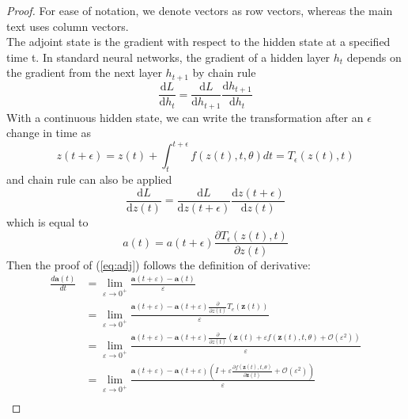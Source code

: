 \documentclass{article}
\newcommand\pef[1]{(\ref{#1})}
\begin{document}
	\begin{proof}
		For ease of notation, we denote vectors as row vectors, whereas the main text uses column vectors.
		\\
		
		The adjoint state is the gradient with respect to the hidden state at a specified time t. In standard neural networks,
		the gradient of a hidden layer $h_t$ depends on the gradient from the next layer $h_{t+1}$ by chain rule
		\begin{equation*}
		\frac{\text{d}L}{\text{d}h_t} = \frac{\text{d}L}{\text{d}h_{t+1}}\frac{\text{d}h_{t+1}}{\text{d}h_t}		
		\end{equation*}
		With a continuous hidden state, we can write the transformation after an $\epsilon$ change in time as
		\begin{equation*}
		z(t+\epsilon) = z(t) + \int_t^{t+\epsilon} f(z(t),t,\theta)dt = T_\epsilon(z(t),t)
		\end{equation*}
		and chain rule can also be applied
		\begin{equation*}
		\frac{\text{d}L}{\text{d}z(t)} = \frac{\text{d}L}{\text{d}{z(t+\epsilon)}}\frac{\text{d}z(t+\epsilon)}{\text{d}z(t)}
		\end{equation*}
		which is equal to
		\begin{equation*}
		a(t) = a(t+\epsilon)\frac{\partial T_\epsilon(z(t),t)}{\partial z(t)}
		\end{equation*}
		Then the proof of \pef{eq:adj} follows the definition of derivative: 
		\begin{equation*}	
		\begin{aligned}  \frac { d \mathbf { a } ( t ) } { d t }&= \lim _ { \varepsilon \rightarrow 0 ^ { + } } \frac { \mathbf { a } ( t + \varepsilon ) - \mathbf { a } ( t ) } { \varepsilon }\\
		&= \lim _ { \varepsilon \rightarrow 0 ^ { + } } \frac { \mathbf { a } ( t + \varepsilon ) - \mathbf { a } ( t + \varepsilon ) \frac { \partial } { \partial z ( t ) } T _ { e } ( \mathbf { z } ( t ) ) } { \varepsilon } \\
		&= \lim _ { \varepsilon \rightarrow 0 ^ { + } } \frac { \mathbf { a } ( t + \varepsilon ) - \mathbf { a } ( t + \varepsilon ) \frac { \partial } { \partial z ( t ) } \left( \mathbf { z } ( t ) + \varepsilon f ( \mathbf { z } ( t ) , t , \theta ) + \mathcal { O } \left( \varepsilon ^ { 2 } \right) \right) } { \varepsilon } \\
		&= \lim _ { \varepsilon \rightarrow 0 ^ { + } } \frac { \mathbf { a } ( t + \varepsilon ) - \mathbf { a } ( t + \varepsilon ) \left( I + \varepsilon \frac { \partial f ( \mathbf { z } ( t ) , t , \theta ) } { \partial \mathbf { z } ( t ) } + \mathcal { O } \left( \varepsilon ^ { 2 } \right) \right) } { \varepsilon } \\ 

\end{aligned}
\end{equation*}
\end{proof}
\end{document}
